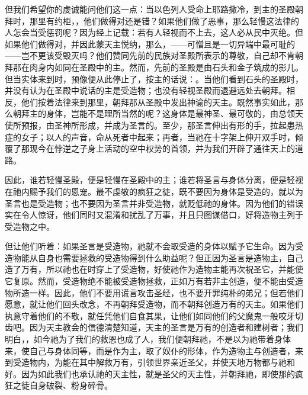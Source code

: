 但我们希望你的虔诚能问他们这一点：当以色列人受命上耶路撒冷，到主的圣殿朝拜时，那里有约柜，，他们做得对还是错？如果他们做了恶事，那么轻慢这法律的人怎会当受惩罚呢？因为经上记载：若有人轻视而不上去，这人必从民中灭绝。但如果他们做得对，并因此蒙天主悦纳，那么，——可憎且是一切异端中最可耻的——岂不更该受毁灭吗？他们赞同先前的民族对圣殿所表示的尊敬，自己却不肯朝拜那在肉身内如同在圣殿中的主。然而，先前的圣殿是由石头和金子筑成的影儿。但当实体来到时，预像便从此停止了，按主的话说：。当他们看到石头的圣殿时，并没有认为在圣殿中说话的主是受造物；也没有轻视圣殿而退避远处去朝拜。相反，他们按着法律来到那里，朝拜那从圣殿中发出神谕的天主。既然事实如此，那么朝拜主的身体，岂能不是理所当然的呢？这身体是最神圣、最可敬的，由总领天使所预报，由圣神所形成，并成为圣言的。至少，那圣言伸出有形的手，拉起患热症的女子；以人的声音，命从死者中起来；再者，当祂在十字架上伸开双手时，倾覆了那现今在悖逆之子身上活动的空中权势的首领，并为我们开辟了通往天上的道路。\par

因此，谁若轻慢圣殿，便是轻慢在圣殿中的主；谁若将圣言与身体分离，便是轻视在祂内赐予我们的恩宠。最不虔敬的疯狂之徒，既不要因为身体是受造的，就以为圣言也是受造物；也不要因为圣言并非受造物，就贬低祂的身体。因为他们的错误实在令人惊讶，他们同时又混淆和扰乱了万事，并且只图谋借口，好将造物主列于受造物之中。\par

但让他们听着：如果圣言是受造物，祂就不会取受造的身体以赋予它生命。因为受造物能从自身也需要拯救的受造物得到什么助益呢？但正因为圣言是造物主，自己造了万有，所以祂也在时穿上了受造物，好使祂作为造物主能再次祝圣它，并能使它复原。然而，受造物绝不能被受造物拯救，正如万有若非主创造，便不能由受造物所造一样。因此，他们不要用谎言攻击圣经，也不要开罪纯朴的弟兄；但若他们愿意，就让他们回头改念，不再朝拜受造物，而不朝拜创造万有的天主。如果他们执意守着他们的不敬，就任凭他们自食其果，让他们如同他们的父魔鬼一般咬牙切齿吧。因为天主教会的信德清楚知道，天主的圣言是万有的创造者和建树者；我们明白，，如今祂为了我们的救恩也成了人，我们便朝拜祂，不是以为祂带着身体来，使自己与身体同等，而是作为主，取了奴仆的形体，作为造物主与创造者，来到受造物内，为能在其中解救万有，引领世界亲近圣父，并使天地万物都与祂和好。因为如此我们也承认祂的天主性，就是圣父的天主性，并朝拜祂，即使那的疯狂之徒自身破裂、粉身碎骨。\par

